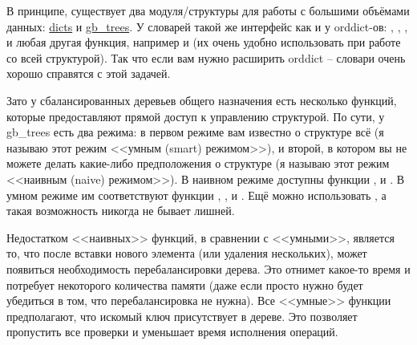 В принципе, существует два модуля/структуры для работы с большими объёмами данных: \href{http://erldocs.com/R15B/stdlib/dict.html}{dicts} и \href{http://erldocs.com/R15B/stdlib/gb\_trees.html}{gb\_trees}.
У словарей такой же интерфейс как и у orddict\--ов: , , ,  и любая другая функция, например  и  (их очень удобно использовать при работе со всей структурой).
Так что если вам нужно расширить orddict \--- словари очень хорошо справятся с этой задачей.

Зато у сбалансированных деревьев общего назначения есть несколько функций, которые предоставляют прямой доступ к управлению структурой.
По сути, у gb\_trees есть два режима: в первом режиме вам известно о структуре всё (я называю этот режим <<умным (smart) режимом>>), и второй, в котором вы не можете делать какие\--либо предположения о структуре (я называю этот режим <<наивным (naive) режимом>>).
В наивном режиме доступны функции ,  и .
В умном режиме им соответствуют функции , ,  и .
Ещё можно использовать , а такая возможность никогда не бывает лишней.

Недостатком <<наивных>> функций, в сравнении с <<умными>>, является то, что после вставки нового элемента (или удаления нескольких), может появиться необходимость перебалансировки дерева.
Это отнимет какое\--то время и потребует некоторого количества памяти (даже если просто нужно будет убедиться в том, что перебалансировка не нужна).
Все <<умные>> функции предполагают, что искомый ключ присутствует в дереве.
Это позволяет пропустить все проверки и уменьшает время исполнения операций.

